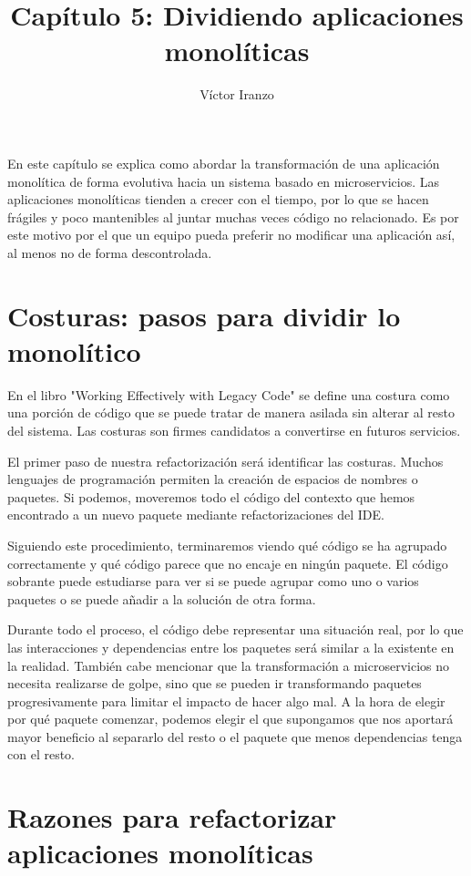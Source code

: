 \documentclass[11pt,a4paper]{article}
\author{Víctor Iranzo}
\title{Capítulo 5: Dividiendo aplicaciones monolíticas}
\begin{document}
\maketitle

En este capítulo se explica como abordar la transformación de una aplicación monolítica de forma evolutiva hacia un sistema basado en microservicios. Las aplicaciones monolíticas tienden a crecer con el tiempo, por lo que se hacen frágiles y poco mantenibles al juntar muchas veces código no relacionado. Es por este motivo por el que un equipo pueda preferir no modificar una aplicación así, al menos no de forma descontrolada.

\part{Costuras: pasos para dividir lo monolítico}

En el libro "Working Effectively with Legacy Code" se define una costura como una porción de código que se puede tratar de manera asilada sin alterar al resto del sistema. Las costuras son firmes candidatos a convertirse en futuros servicios.

El primer paso de nuestra refactorización será identificar las costuras. Muchos lenguajes de programación permiten la creación de espacios de nombres o paquetes. Si podemos, moveremos todo el código del contexto que hemos encontrado a un nuevo paquete mediante refactorizaciones del IDE. 

Siguiendo este procedimiento, terminaremos viendo qué código se ha agrupado correctamente y qué código parece que no encaje en ningún paquete. El código sobrante puede estudiarse para ver si se puede agrupar como uno o varios paquetes o se puede añadir a la solución de otra forma. 

Durante todo el proceso, el código debe representar una situación real, por lo que las interacciones y dependencias entre los paquetes será similar a la existente en la realidad. También cabe mencionar que la transformación a microservicios no necesita realizarse de golpe, sino que se pueden ir transformando paquetes progresivamente para limitar el impacto de hacer algo mal. A la hora de elegir por qué paquete comenzar, podemos elegir el que supongamos que nos aportará mayor beneficio al separarlo del resto o el paquete que menos dependencias tenga con el resto.

\part{Razones para refactorizar aplicaciones monolíticas}
\end{document}
